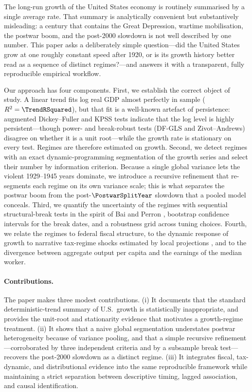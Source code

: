 \documentclass[11pt]{article}
\begin{document}
The long-run growth of the United States economy is routinely summarised by a
single average rate. That summary is analytically convenient but substantively
misleading: a century that contains the Great Depression, wartime mobilisation,
the postwar boom, and the post-2000 slowdown is not well described by one number.
This paper asks a deliberately simple question---did the United States grow at
one roughly constant speed after 1920, or is its growth history better read as a
sequence of distinct regimes?---and answers it with a transparent, fully
reproducible empirical workflow.

Our approach has four components. First, we establish the correct object of
study. A linear trend fits log real GDP almost perfectly in sample
($R^2 = \TrendRSquared$), but that fit is a well-known artefact of persistence:
augmented Dickey--Fuller \citep{saiddickey1984} and KPSS \citep{kpss1992} tests
indicate that the log level is highly persistent---though power- and
break-robust tests (DF-GLS and Zivot--Andrews) disagree on whether it is a unit
root---while the growth rate is stationary on every test. Regimes are therefore
estimated on growth. Second, we
detect regimes with an exact dynamic-programming segmentation of the growth
series and select their number by information criterion. Because a single global
variance lets the violent 1929--1945 years dominate, we introduce a recursive
refinement that re-segments each regime on its own variance scale; this is what
separates the postwar boom from the post-$\PostwarSplitYear$ slowdown that a
pooled model conceals. Third, we quantify the uncertainty of the regimes with
sequential structural-break tests in the spirit of Bai and Perron
\citep{baiperron1998,baiperron2003}, bootstrap confidence intervals for the break
dates, and a robustness grid across tuning choices. Fourth, we relate the regimes
to federal fiscal structure, to the dynamic response of growth to narrative
tax-regime shocks estimated by local projections \citep{jorda2005}, and to the
divergence between aggregate output per capita and the earnings of the median
worker.

\paragraph{Contributions.} The paper makes three modest contributions. (i) It
documents that the standard deterministic-trend summary of U.S.\ growth is
statistically inappropriate, and provides the unit-root and stationarity evidence
that motivates a growth-regime treatment. (ii) It shows that a naive global
segmentation understates postwar heterogeneity because of variance pooling, and
that a simple recursive refinement---corroborated by three independent criteria
and by a subsample break test---recovers the post-2000 slowdown as a distinct
regime. (iii) It integrates fiscal, tax-dynamic, and distributional evidence into
the same reproducible framework while maintaining a strict separation between
descriptive timing, lagged association, and causal identification.
\end{document}
